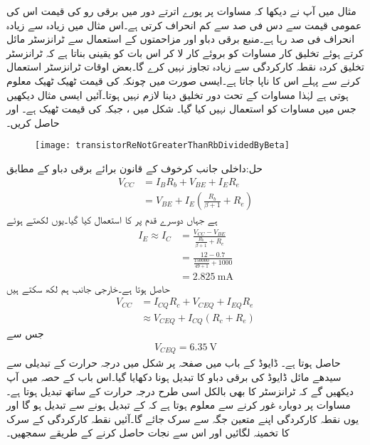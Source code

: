 مثال  میں آپ نے دیکھا کہ مساوات   پر پورے اترتے دور میں برقی رو کی قیمت اس کی عمومی قیمت سے دس فی صد سے کم انحراف کرتی ہے۔اس مثال میں زیادہ سے زیادہ انحراف   فی صد رہا ہے۔منبع برقی دباو اور مزاحمتوں کے استعمال سے ٹرانزسٹر مائل کرتے ہوئے تخلیق کار مساوات   کو بروئے کار لا کر اس بات کو یقینی بناتا ہے کہ ٹرانزسٹر تخلیق کردہ نقطہ کارکردگی سے زیادہ تجاوز نہیں کرے گا۔بعض اوقات ٹرانزسٹر استعمال کرنے سے پہلے اس کا  ناپا جاتا ہے۔ایسی صورت میں چونکہ  کی قیمت ٹھیک ٹھیک معلوم ہوتی ہے لہٰذا مساوات  کے تحت دور تخلیق دینا لازم نہیں ہوتا۔آئیں ایسی مثال دیکھیں جس میں مساوات  کو استعمال نہیں کیا گیا۔
شکل  میں  ،  جبکہ  کی قیمت ٹھیک  ہے۔ اور  حاصل کریں۔
\begin{figure}
\centering
\texttt{[image: transistorReNotGreaterThanRbDividedByBeta]}
\caption{}
\label{شکل_ٹرانزسٹر_بیٹا_ٹھیک_ٹھیک_معلوم}
\end{figure}

حل:داخلی جانب کرخوف کے قانون برائے برقی دباو کے مطابق
\begin{align*}
V_{CC}&=I_B R_b+V_{BE}+I_E R_e\\
&=V_{BE}+I_E \left(\frac{R_b}{\beta+1}+R_e \right)
\end{align*}
ہے جہاں دوسرے قدم پر  کا استعمال کیا گیا۔یوں  لکھتے ہوئے
\begin{align*}
I_E \approx I_C &= \frac{V_{CC}-V_{BE}}{\frac{R_b}{\beta+1}+R_e}\\
&=\frac{12-0.7}{\frac{150000}{49+1}+1000}\\
&=\SI{2.825}{\milli \ampere}
\end{align*}
حاصل ہوتا ہے۔خارجی جانب ہم لکھ سکتے  ہیں
\begin{align*}
V_{CC}&=I_{CQ} R_c+V_{CEQ}+I_{EQ} R_e\\
&\approx V_{CEQ}+I_{CQ} \left(R_c+R_e \right)
\end{align*}
جس سے
\begin{align*}
V_{CEQ}=\SI{6.35}{\volt}
\end{align*}
حاصل ہوتا ہے۔
  \label{حصہ_تبدیلی_برقی_دباو_سے_نکتہ_کارکردگی_کا_سرک_جانا}
ڈایوڈ کے باب میں صفحہ  \pageref{شکل_برقی_دباو_بالمقابل_حرارت}  پر شکل   میں درجہ حرارت کے تبدیلی سے سیدھے مائل ڈایوڈ کی برقی دباو   کا تبدیل ہونا دکھایا گیا۔اس باب کے حصہ  میں آپ دیکھیں گے کہ ٹرانزسٹر کا   بھی بالکل اسی طرح درجہ حرارت کے ساتھ تبدیل ہوتا ہے۔مساوات   پر دوبارہ غور کرنے سے معلوم ہوتا ہے کہ  کے تبدیل ہونے سے   تبدیل ہو گا اور یوں نقطہ کارکردگی اپنے متعین جگہ سے سرک جائے گا۔آئیں نقطہ کارکردگی کے سرک کا تخمینہ لگائیں اور اس سے نجات حاصل کرنے کے طریقے سمجھیں۔

